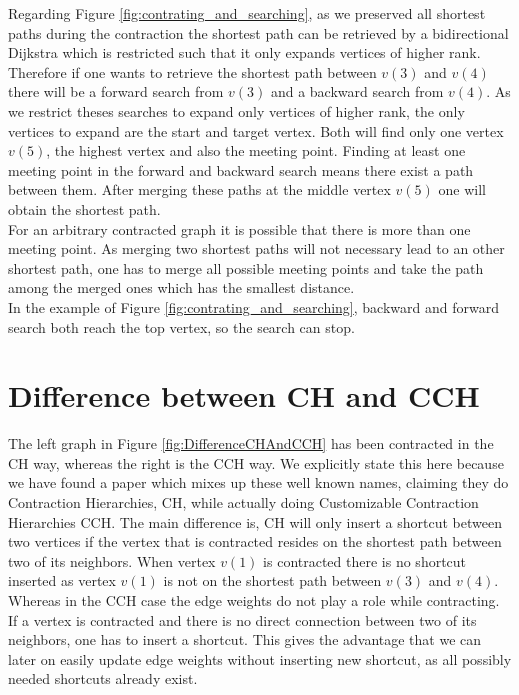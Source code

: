 Regarding Figure \ref{fig:contrating_and_searching}, as we preserved all shortest paths during the contraction the shortest path can be retrieved by a bidirectional Dijkstra which is restricted such that it only expands vertices of higher rank.
Therefore if one wants to retrieve the shortest path between $v(3)$ and $v(4)$ there will be a forward search from $v(3)$ and a backward search from $v(4)$.
As we restrict theses searches to expand only vertices of higher rank, the only vertices to expand are the start and target vertex.
Both will find only one vertex $v(5)$, the highest vertex and also the meeting point.
Finding at least one meeting point in the forward and backward search means there exist a path between them.
After merging these paths at the middle vertex $v(5)$ one will obtain the shortest path.
\\
For an arbitrary contracted graph it is possible that there is more than one meeting point.
As merging two shortest paths will not necessary lead to an other shortest path, one has to merge all possible meeting points and take the path among the merged ones which has the smallest distance.
\\ 
In the example of Figure \ref{fig:contrating_and_searching}, backward and forward search both reach the top vertex, so the search can stop.

\section{Difference between CH and CCH}

The left graph in Figure \ref{fig:DifferenceCHAndCCH} has been contracted in the CH way, whereas the right is the CCH way.
We explicitly state this here because we have found a paper \cite{Ouyang_2020} which mixes up these well known names, claiming they do Contraction Hierarchies, CH, while actually doing Customizable Contraction Hierarchies CCH.
The main difference is, CH will only insert a shortcut between two vertices if the vertex that is contracted resides on the shortest path between two of its neighbors.
When vertex $v(1)$ is contracted there is no shortcut inserted as vertex $v(1)$ is not on the shortest path between $v(3)$ and $v(4)$.
\\
Whereas in the CCH case the edge weights do not play a role while contracting.
If a vertex is contracted and there is no direct connection between two of its neighbors, one has to insert a shortcut.
This gives the advantage that we can later on easily update edge weights without inserting new shortcut, as all possibly needed shortcuts already exist.

